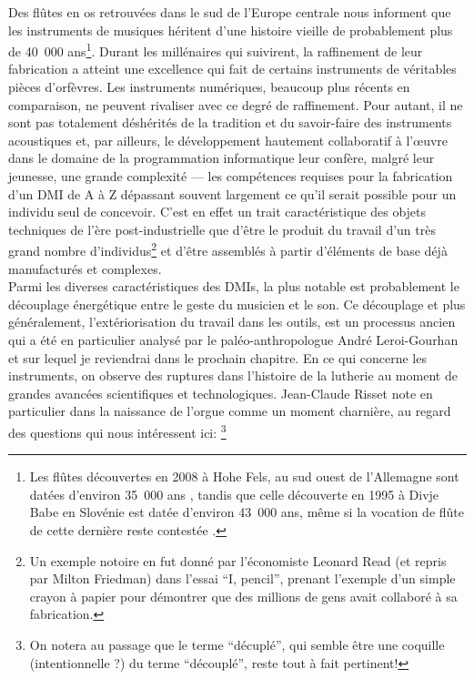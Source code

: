 \noindent Des flûtes en os retrouvées dans le sud de l'Europe centrale nous informent que les instruments de musiques héritent d'une histoire vieille de probablement plus de 40~000 ans\footnote{Les flûtes découvertes en 2008 à Hohe Fels, au sud ouest de l'Allemagne sont datées d'environ 35~000 ans \cite{conard_new_2009}, tandis que celle découverte en 1995 à Divje Babe en Slovénie est datée d'environ 43~000 ans, même si la vocation de flûte de cette dernière reste contestée \cite{turk_neanderthal_2020}.}. Durant les millénaires qui suivirent, la raffinement de leur fabrication a atteint une excellence qui fait de certains instruments de véritables pièces d'orfèvres. Les instruments numériques, beaucoup plus récents en comparaison, ne peuvent rivaliser avec ce degré de raffinement. Pour autant, il ne sont pas totalement déshérités de la tradition et du savoir-faire des instruments acoustiques et, par ailleurs, le développement hautement collaboratif à l'œuvre dans le domaine de la programmation informatique leur confère, malgré leur jeunesse, une grande complexité — les compétences requises pour la fabrication d'un \gls{DMI} de A à Z dépassant souvent largement ce qu'il serait possible pour un individu seul de concevoir. C'est en effet un trait caractéristique des objets techniques de l'ère post-industrielle que d'être le produit du travail d'un très grand nombre d'individus\footnote{Un exemple notoire en fut donné par l'économiste Leonard Read (et repris par Milton Friedman) dans l'essai ``I, pencil''\cite{read_i_1958}, prenant l'exemple d'un simple crayon à papier pour démontrer que des millions de gens avait collaboré à sa fabrication.} et d'être assemblés à partir d'éléments de base déjà manufacturés et complexes.\\
\indent Parmi les diverses caractéristiques des \glspl{DMI}, la plus notable est probablement le découplage énergétique entre le geste du musicien et le son. Ce découplage et plus généralement, l'extériorisation du travail dans les outils, est un processus ancien qui a été en particulier analysé par le paléo-anthropologue André Leroi-Gourhan \cite{leroi-gourhan_geste_1964} et sur lequel je reviendrai dans le prochain chapitre. En ce qui concerne les instruments, on observe des ruptures dans l'histoire de la lutherie au moment de grandes avancées scientifiques et technologiques. Jean-Claude Risset note en particulier dans \cite{genevois_les_1999} la naissance de l'orgue comme un moment charnière, au regard des questions qui nous intéressent ici: \footnote{On notera au passage que le terme ``décuplé'', qui semble être une coquille (intentionnelle ?) du terme ``découplé'', reste tout à fait pertinent!}\\
